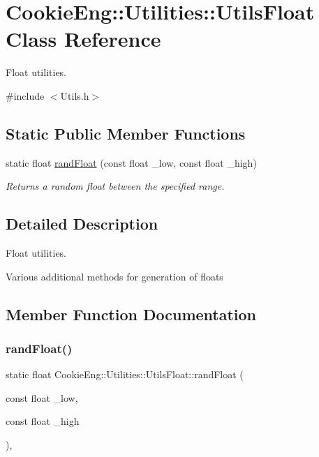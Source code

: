 \hypertarget{class_cookie_eng_1_1_utilities_1_1_utils_float}{}\section{Cookie\+Eng\+:\+:Utilities\+:\+:Utils\+Float Class Reference}
\label{class_cookie_eng_1_1_utilities_1_1_utils_float}


Float utilities.  




{\ttfamily \#include $<$Utils.\+h$>$}

\subsection*{Static Public Member Functions}
\begin{DoxyCompactItemize}
\item 
static float \hyperlink{class_cookie_eng_1_1_utilities_1_1_utils_float_a33f2113c8793098aa33ddef2313a6bb0}{rand\+Float} (const float \+\_\+low, const float \+\_\+high)
\begin{DoxyCompactList}\small\item\em Returns a random float between the specified range. \end{DoxyCompactList}\end{DoxyCompactItemize}


\subsection{Detailed Description}
Float utilities. 

Various additional methods for generation of floats 

\subsection{Member Function Documentation}
\mbox{\label{class_cookie_eng_1_1_utilities_1_1_utils_float_a33f2113c8793098aa33ddef2313a6bb0}} 
\subsubsection{\texorpdfstring{rand\+Float()}{randFloat()}}
{\footnotesize\ttfamily static float Cookie\+Eng\+::\+Utilities\+::\+Utils\+Float\+::rand\+Float (\begin{DoxyParamCaption}\item[{const float}]{\+\_\+low,  }\item[{const float}]{\+\_\+high }\end{DoxyParamCaption})\hspace{0.3cm}{\ttfamily [inline]}, {\ttfamily [static]}}



